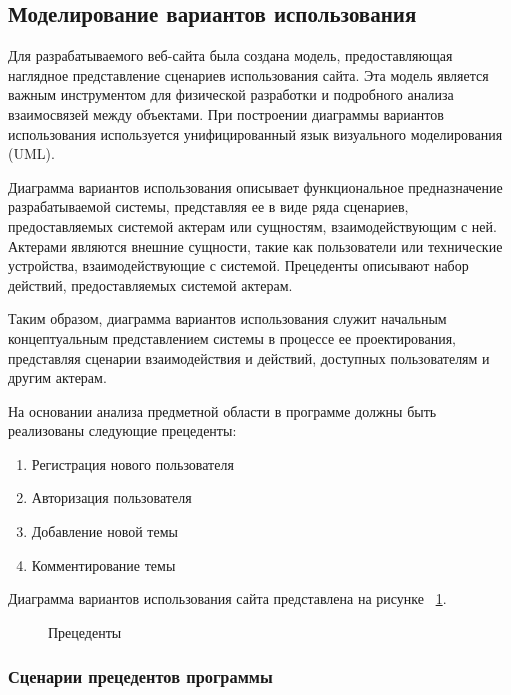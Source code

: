 \subsection{Моделирование вариантов использования}

Для разрабатываемого веб-сайта была создана модель, предоставляющая наглядное представление сценариев использования сайта. Эта модель является важным инструментом для физической разработки и подробного анализа взаимосвязей между объектами. При построении диаграммы вариантов использования используется унифицированный язык визуального моделирования (UML).

Диаграмма вариантов использования описывает функциональное предназначение разрабатываемой системы, представляя ее в виде ряда сценариев, предоставляемых системой актерам или сущностям, взаимодействующим с ней. Актерами являются внешние сущности, такие как пользователи или технические устройства, взаимодействующие с системой. Прецеденты описывают набор действий, предоставляемых системой актерам.

Таким образом, диаграмма вариантов использования служит начальным концептуальным представлением системы в процессе ее проектирования, представляя сценарии взаимодействия и действий, доступных пользователям и другим актерам.

На основании анализа предметной области в программе должны быть реализованы следующие прецеденты:
\begin{enumerate}
\item Регистрация нового пользователя
\item Авторизация пользователя
\item Добавление новой темы
\item Комментирование темы
\end{enumerate}

Диаграмма вариантов использования сайта представлена на рисунке 
~\ref{прецеденты:image}.

\begin{figure}[H]
	
	\caption{Прецеденты}
	\label{прецеденты:image}
\end{figure}

\subsubsection{Сценарии прецедентов программы}

